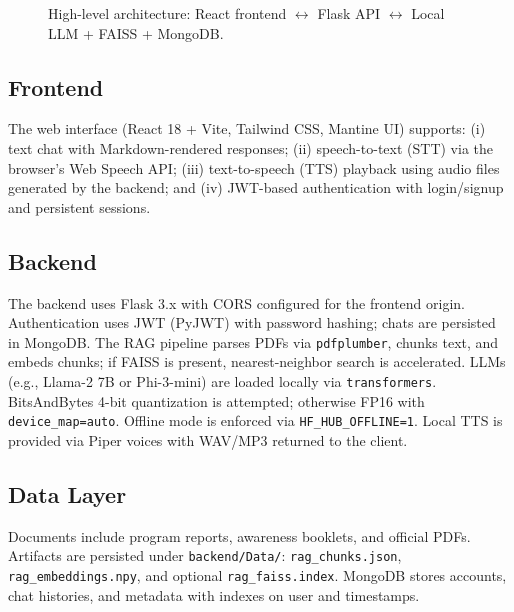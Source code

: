 \documentclass[conference]{IEEEtran}
\begin{document}
\begin{figure}[t]
  \centering
  \caption{High-level architecture: React frontend \(\leftrightarrow\) Flask API \(\leftrightarrow\) Local LLM + FAISS + MongoDB.}
  \label{fig:arch}
\end{figure}

\subsection{Frontend}
The web interface (React 18 + Vite, Tailwind CSS, Mantine UI) supports: (i) text chat with Markdown-rendered responses; (ii) speech-to-text (STT) via the browser’s Web Speech API; (iii) text-to-speech (TTS) playback using audio files generated by the backend; and (iv) JWT-based authentication with login/signup and persistent sessions.

\subsection{Backend}
The backend uses Flask 3.x with CORS configured for the frontend origin. Authentication uses JWT (PyJWT) with password hashing; chats are persisted in MongoDB. The RAG pipeline parses PDFs via \texttt{pdfplumber}, chunks text, and embeds chunks; if FAISS is present, nearest-neighbor search is accelerated. LLMs (e.g., Llama-2 7B or Phi-3-mini) are loaded locally via \texttt{transformers}. BitsAndBytes 4-bit quantization is attempted; otherwise FP16 with \texttt{device\_map=auto}. Offline mode is enforced via \texttt{HF\_HUB\_OFFLINE=1}. Local TTS is provided via Piper voices with WAV/MP3 returned to the client.

\subsection{Data Layer}
Documents include program reports, awareness booklets, and official PDFs. Artifacts are persisted under \texttt{backend/Data/}: \texttt{rag\_chunks.json}, \texttt{rag\_embeddings.npy}, and optional \texttt{rag\_faiss.index}. MongoDB stores accounts, chat histories, and metadata with indexes on user and timestamps.
\end{document}
